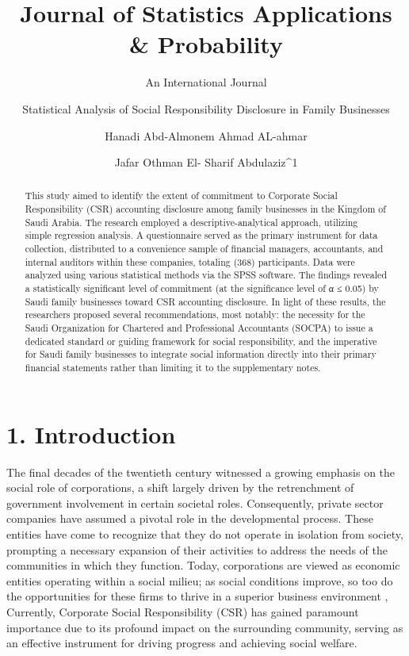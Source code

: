 \documentclass{default}
\begin{document}
\journalheader

\title{Journal of Statistics Applications \& Probability}
\author{An International Journal \and Statistical Analysis of Social Responsibility Disclosure in Family Businesses \and Hanadi Abd-Almonem Ahmad AL-ahmar \and Jafar Othman El- Sharif Abdulaziz^{1}}
\date{}
\maketitle

\begin{abstract}
This study aimed to identify the extent of commitment to Corporate Social Responsibility (CSR) accounting disclosure among family businesses in the Kingdom of Saudi Arabia. The research employed a descriptive-analytical approach, utilizing simple regression analysis. A questionnaire served as the primary instrument for data collection, distributed to a convenience sample of financial managers, accountants, and internal auditors within these companies, totaling (368) participants. Data were analyzed using various statistical methods via the SPSS software. The findings revealed a statistically significant level of commitment (at the significance level of α ≤ 0.05) by Saudi family businesses toward CSR accounting disclosure. In light of these results, the researchers proposed several recommendations, most notably: the necessity for the Saudi Organization for Chartered and Professional Accountants (SOCPA) to issue a dedicated standard or guiding framework for social responsibility, and the imperative for Saudi family businesses to integrate social information directly into their primary financial statements rather than limiting it to the supplementary notes.
\end{abstract}

\section{1. Introduction}

The final decades of the twentieth century witnessed a growing emphasis on the social role of corporations, a shift largely driven by the retrenchment of government involvement in certain societal roles. Consequently, private sector companies have assumed a pivotal role in the developmental process. These entities have come to recognize that they do not operate in isolation from society, prompting a necessary expansion of their activities to address the needs of the communities in which they function. Today, corporations are viewed as economic entities operating within a social milieu; as social conditions improve, so too do the opportunities for these firms to thrive in a superior business environment \cite{ref1}, Currently, Corporate Social Responsibility (CSR) has gained paramount importance due to its profound impact on the surrounding community, serving as an effective instrument for driving progress and achieving social welfare.
\end{document}
